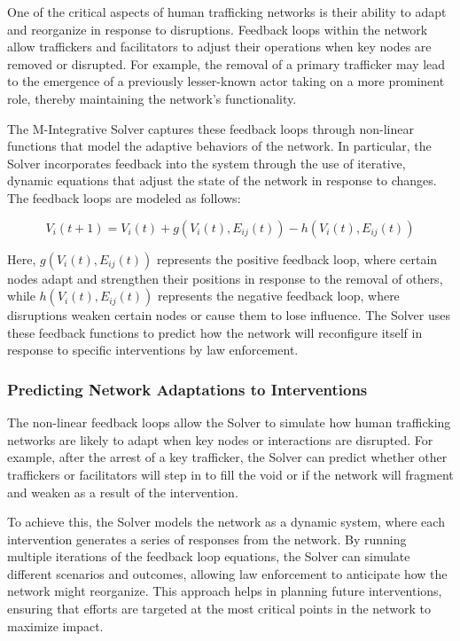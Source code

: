 \documentclass[%
 preprint, linenumbers,
 amsmath,amssymb,
 aps, physrev,
]{revtex4-2}
\begin{document}
One of the critical aspects of human trafficking networks is their ability to adapt and reorganize in response to disruptions. Feedback loops within the network allow traffickers and facilitators to adjust their operations when key nodes are removed or disrupted. For example, the removal of a primary trafficker may lead to the emergence of a previously lesser-known actor taking on a more prominent role, thereby maintaining the network’s functionality.

The M-Integrative Solver captures these feedback loops through non-linear functions that model the adaptive behaviors of the network. In particular, the Solver incorporates feedback into the system through the use of iterative, dynamic equations that adjust the state of the network in response to changes. The feedback loops are modeled as follows:

\[
V_i(t+1) = V_i(t) + g(V_i(t), E_{ij}(t)) - h(V_i(t), E_{ij}(t))
\]

Here, \( g(V_i(t), E_{ij}(t)) \) represents the positive feedback loop, where certain nodes adapt and strengthen their positions in response to the removal of others, while \( h(V_i(t), E_{ij}(t)) \) represents the negative feedback loop, where disruptions weaken certain nodes or cause them to lose influence. The Solver uses these feedback functions to predict how the network will reconfigure itself in response to specific interventions by law enforcement.

\subsubsection{Predicting Network Adaptations to Interventions}

The non-linear feedback loops allow the Solver to simulate how human trafficking networks are likely to adapt when key nodes or interactions are disrupted. For example, after the arrest of a key trafficker, the Solver can predict whether other traffickers or facilitators will step in to fill the void or if the network will fragment and weaken as a result of the intervention.

To achieve this, the Solver models the network as a dynamic system, where each intervention generates a series of responses from the network. By running multiple iterations of the feedback loop equations, the Solver can simulate different scenarios and outcomes, allowing law enforcement to anticipate how the network might reorganize. This approach helps in planning future interventions, ensuring that efforts are targeted at the most critical points in the network to maximize impact.
\end{document}
